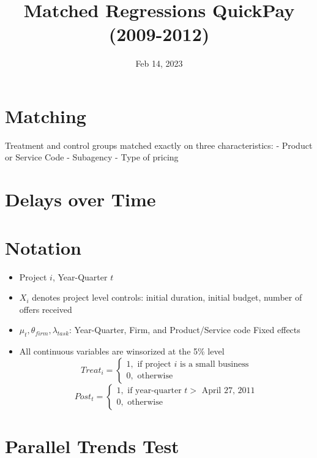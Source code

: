 \documentclass[
]{article}
\title{Matched Regressions QuickPay (2009-2012)}
\author{}
\date{\vspace{-2.5em}Feb 14, 2023}
\providecommand{\tightlist}{%
  \setlength{\itemsep}{0pt}\setlength{\parskip}{0pt}}
\begin{document}
\maketitle

\hypertarget{matching}{%
\section{Matching}\label{matching}}

Treatment and control groups matched exactly on three characteristics: -
Product or Service Code - Subagency - Type of pricing

\hypertarget{delays-over-time}{%
\section{Delays over Time}\label{delays-over-time}}

\hypertarget{notation}{%
\section{Notation}\label{notation}}

\begin{itemize}
\tightlist
\item
  Project \(i\), Year-Quarter \(t\)
\item
  \(X_i\) denotes project level controls: initial duration, initial
  budget, number of offers received
\item
  \(\mu_t,\theta_{firm},\lambda_{task}\): Year-Quarter, Firm, and
  Product/Service code Fixed effects
\item
  All continuous variables are winsorized at the 5\% level
  \[ Treat_i = \begin{cases} 1, \text{ if project } i \text{ is a small business}\\
  0, \text{ otherwise} \end{cases}\]
  \[ Post_t = \begin{cases} 1, \text{ if year-quarter } t > \text{ April 27, 2011}\\
  0, \text{ otherwise} \end{cases}\]
\end{itemize}

\hypertarget{parallel-trends-test}{%
\section{Parallel Trends Test}\label{parallel-trends-test}}
\end{document}
